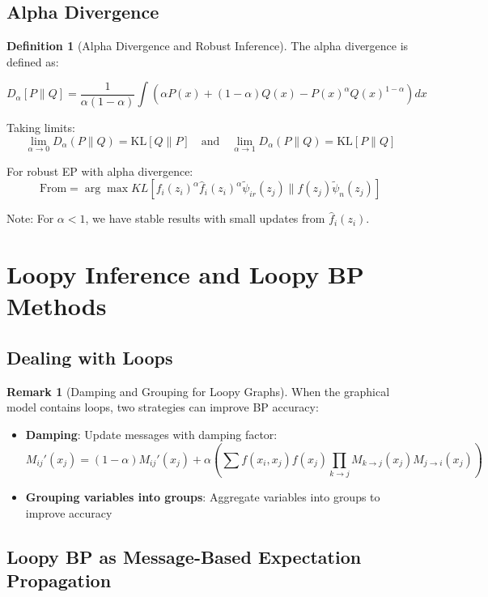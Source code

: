 \documentclass[12pt,a4paper]{article}
\theoremstyle{definition}
\newtheorem{definition}{Definition}[section]
\newtheorem{remark}{Remark}[section]
\begin{document}
\subsection{Alpha Divergence}

\begin{definition}[Alpha Divergence and Robust Inference]
The alpha divergence is defined as:

\[
D_\alpha[P \| Q] = \frac{1}{\alpha(1-\alpha)} \int (\alpha P(x) + (1-\alpha)Q(x) - P(x)^\alpha Q(x)^{1-\alpha}) dx
\]

Taking limits:
\[
\lim_{\alpha \to 0} D_\alpha(P \| Q) = \text{KL}[Q \| P] \quad \text{and} \quad \lim_{\alpha \to 1} D_\alpha(P \| Q) = \text{KL}[P \| Q]
\]

For robust EP with alpha divergence:
\[
\text{From} = \arg\max KL[f_i(z_i)^\alpha \hat{f}_i(z_i)^\alpha \tilde{\psi}_{ir}(z_j) \| f(z_j) \tilde{\psi}_n(z_j)]
\]

Note: For $\alpha < 1$, we have stable results with small updates from $\hat{f}_i(z_i)$.
\end{definition}

\newpage

\section{Loopy Inference and Loopy BP Methods}

\subsection{Dealing with Loops}

\begin{remark}[Damping and Grouping for Loopy Graphs]
When the graphical model contains loops, two strategies can improve BP accuracy:

\begin{itemize}
    \item \textbf{Damping}: Update messages with damping factor:
    \[
    M_{ij}'(x_j) = (1-\alpha) M_{ij}'(x_j) + \alpha \left( \sum f(x_i, x_j) f(x_j) \prod_{k \to j} M_{k \to j}(x_j) M_{j \to i}(x_j) \right)
    \]
    
    \item \textbf{Grouping variables into groups}: Aggregate variables into groups to improve accuracy
\end{itemize}
\end{remark}

\subsection{Loopy BP as Message-Based Expectation Propagation}
\end{document}
